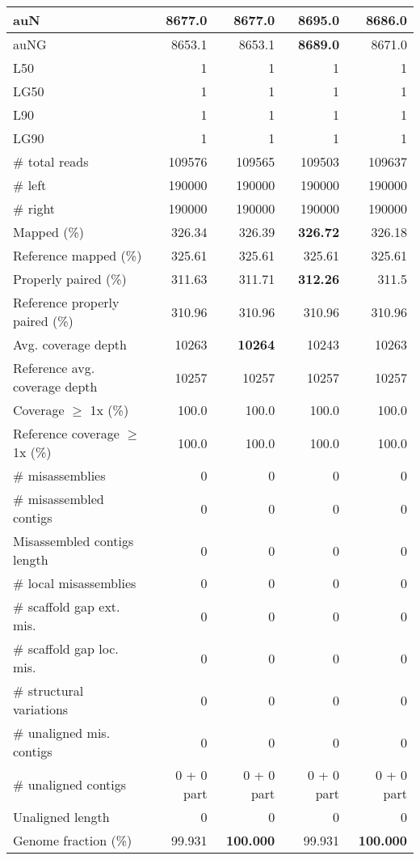 \documentclass[12pt,a4paper]{article}
\begin{document}
\begin{table}[ht]
\begin{center}
\begin{tabular}{|l*{4}{|r}|}
auN & 8677.0 & 8677.0 & {\bf 8695.0} & 8686.0 \\ \hline
auNG & 8653.1 & 8653.1 & {\bf 8689.0} & 8671.0 \\ \hline
L50 & 1 & 1 & 1 & 1 \\ \hline
LG50 & 1 & 1 & 1 & 1 \\ \hline
L90 & 1 & 1 & 1 & 1 \\ \hline
LG90 & 1 & 1 & 1 & 1 \\ \hline
\# total reads & 109576 & 109565 & 109503 & 109637 \\ \hline
\# left & 190000 & 190000 & 190000 & 190000 \\ \hline
\# right & 190000 & 190000 & 190000 & 190000 \\ \hline
Mapped (\%) & 326.34 & 326.39 & {\bf 326.72} & 326.18 \\ \hline
Reference mapped (\%) & 325.61 & 325.61 & 325.61 & 325.61 \\ \hline
Properly paired (\%) & 311.63 & 311.71 & {\bf 312.26} & 311.5 \\ \hline
Reference properly paired (\%) & 310.96 & 310.96 & 310.96 & 310.96 \\ \hline
Avg. coverage depth & 10263 & {\bf 10264} & 10243 & 10263 \\ \hline
Reference avg. coverage depth & 10257 & 10257 & 10257 & 10257 \\ \hline
Coverage $\geq$ 1x (\%) & 100.0 & 100.0 & 100.0 & 100.0 \\ \hline
Reference coverage $\geq$ 1x (\%) & 100.0 & 100.0 & 100.0 & 100.0 \\ \hline
\# misassemblies & 0 & 0 & 0 & 0 \\ \hline
\# misassembled contigs & 0 & 0 & 0 & 0 \\ \hline
Misassembled contigs length & 0 & 0 & 0 & 0 \\ \hline
\# local misassemblies & 0 & 0 & 0 & 0 \\ \hline
\# scaffold gap ext. mis. & 0 & 0 & 0 & 0 \\ \hline
\# scaffold gap loc. mis. & 0 & 0 & 0 & 0 \\ \hline
\# structural variations & 0 & 0 & 0 & 0 \\ \hline
\# unaligned mis. contigs & 0 & 0 & 0 & 0 \\ \hline
\# unaligned contigs & 0 + 0 part & 0 + 0 part & 0 + 0 part & 0 + 0 part \\ \hline
Unaligned length & 0 & 0 & 0 & 0 \\ \hline
Genome fraction (\%) & 99.931 & {\bf 100.000} & 99.931 & {\bf 100.000} \\ \hline

\end{tabular}
\end{center}
\end{table}
\end{document}
